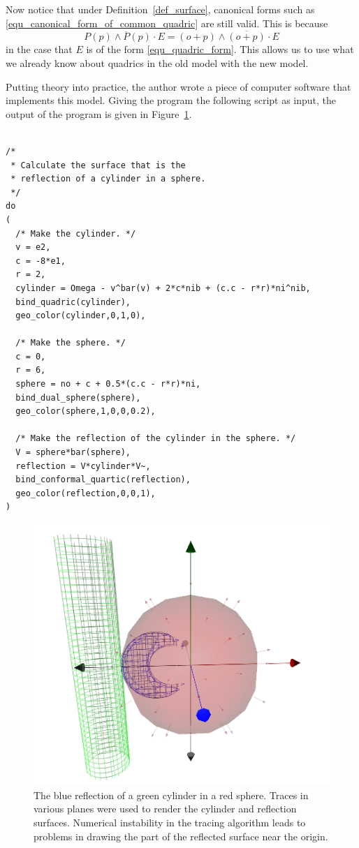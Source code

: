 \documentclass{birkjour}
\theoremstyle{definition}
\theoremstyle{remark}
\numberwithin{equation}{section}
\newcommand{\nvao}{o}
\begin{document}
Now notice that under Definition~\ref{def_surface}, canonical forms
such as \eqref{equ_canonical_form_of_common_quadric} are still valid.
This is because
\begin{equation}
P(p)\wedge\overline{P}(p)\cdot E = (\nvao+p)\wedge\overline{(\nvao+p)}\cdot E
\end{equation}
in the case that $E$ is of the form \eqref{equ_quadric_form}.  This allows
us to use what we already know about quadrics in the old model with the new model.

Putting theory into practice, the author wrote a piece of computer
software that implements this model.  Giving the program the following
script as input, the output of the program is given in Figure~\ref{fig_reflect_cylinder_in_sphere}.
{\small
\begin{verbatim}

/*
 * Calculate the surface that is the
 * reflection of a cylinder in a sphere.
 */
do
(
  /* Make the cylinder. */
  v = e2,
  c = -8*e1,
  r = 2,
  cylinder = Omega - v^bar(v) + 2*c*nib + (c.c - r*r)*ni^nib,
  bind_quadric(cylinder),
  geo_color(cylinder,0,1,0),
	
  /* Make the sphere. */
  c = 0,
  r = 6,
  sphere = no + c + 0.5*(c.c - r*r)*ni,
  bind_dual_sphere(sphere),
  geo_color(sphere,1,0,0,0.2),
	
  /* Make the reflection of the cylinder in the sphere. */
  V = sphere*bar(sphere),
  reflection = V*cylinder*V~,
  bind_conformal_quartic(reflection),
  geo_color(reflection,0,0,1),
)
\end{verbatim}
}
\begin{figure}
\includegraphics[scale=0.4]{ReflectCylinderInSphere}
\caption{The blue reflection of a green cylinder in a red sphere.  Traces in various planes were
used to render the cylinder and reflection surfaces.  Numerical instability in the tracing algorithm
leads to problems in drawing the part of the reflected surface near the origin.}
\label{fig_reflect_cylinder_in_sphere}
\end{figure}
\end{document}
